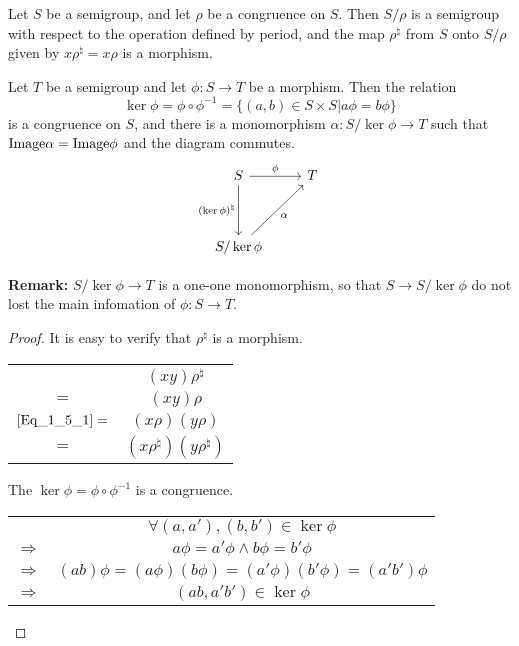 \begin{Them}\label{Them:1.5.2}
    Let $S$ be a semigroup, and let $\rho$ be a congruence on $S$. Then $S/\rho$ is a semigroup with respect to the operation defined by period, and the map $\rho^{\natural}$ from $S$ onto $S/\rho$ given by $x\rho^{\natural}=x\rho$ is a morphism.

    Let $T$ be a semigroup and let $\phi:S\rightarrow T$ be a morphism. Then the relation
    \[
        \ker \phi = \phi \circ \phi^{-1}=\{(a,b)\in S\times S| a\phi = b\phi\}
    \]
    is a congruence on $S$, and there is a monomorphism $\alpha:S/\ker \phi \rightarrow T$ such that $\mathrm{Image} \alpha = \mathrm{Image} \phi$ and the diagram commutes.
    \[
        \begin{tikzcd}
            S
            \arrow[dd, "(\ker \phi)^{\natural}"']
            \arrow[r,"\phi"] &
            T   \\
            \\
            S/\ker \phi
            \arrow[uur, "\alpha"'] &
        \end{tikzcd}
    \]

    \textbf{Remark:} $S/\ker \phi \rightarrow T$ is a one-one monomorphism, so that $S \rightarrow S/\ker \phi$ do not lost the main infomation of $\phi: S\rightarrow T$.
    \begin{proof}
        It is easy to verify that $\rho^{\natural}$ is a morphism.
        \begin{center}
            \begin{tabular}{c c}
                & $(xy)\rho^{\natural}$ \\
                $=$ & $(xy)\rho$        \\
                $\ref{Eq_1_5_1}=$ & $(x\rho)(y\rho)$  \\
                $=$ & $(x\rho^{\natural})(y\rho^{\natural})$
            \end{tabular}
        \end{center}

        The $\ker \phi = \phi \circ \phi^{-1}$ is a congruence.
        \begin{center}
            \begin{tabular}{c c}
                & $\forall (a,a'),(b,b')\in \ker \phi$  \\
                $\Rightarrow $ & $a\phi = a'\phi \wedge b\phi=b'\phi$   \\
                $\Rightarrow $ & $(ab)\phi=(a\phi)(b\phi)=(a'\phi)(b'\phi)=(a'b')\phi$      \\
                $\Rightarrow $ & $(ab, a'b')\in \ker\phi$
            \end{tabular}
        \end{center}


\end{proof}
\end{Them}
